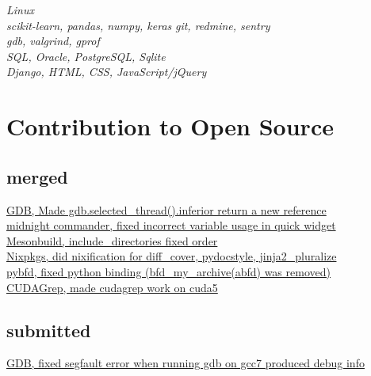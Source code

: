 \documentclass[10pt]{article} %
\begin{document}

{
\textit{Linux}\\
\textit{scikit-learn, pandas, numpy, keras}
\textit{git, redmine, sentry}\\
\textit{gdb, valgrind, gprof}\\
\textit{SQL, Oracle, PostgreSQL, Sqlite}\\
\textit{Django, HTML, CSS, JavaScript/jQuery}
}

\section{Contribution to Open Source}

\subsection{merged}
\href{https://github.com/bminor/binutils-gdb/commit/484d8d361de65a8489252d14511b77c142d859a1}{GDB, Made gdb.selected\_thread().inferior return a new reference}\\
\href{http://midnight-commander.org/ticket/3870?cversion=0&cnum_hist=1}{midnight commander, fixed incorrect variable usage in quick widget}\\
\href{https://github.com/mesonbuild/meson/pull/2976}{Mesonbuild, include\_directories fixed order}\\
\href{https://github.com/NixOS/nixpkgs/pull/33715}{Nixpkgs, did nixification for diff\_cover, pydocstyle, jinja2\_pluralize}\\
\href{https://github.com/orivej/pybfd/commit/f5ed88590c66a3570b7e5b9aa4c723c40686271d}{pybfd, fixed python binding (bfd\_my\_archive(abfd) was removed)}\\
\href{https://github.com/dzabraev/CUDA-grep/commit/79f4fddfab3cc7950cbe6c9b3a54bcb2b87dc3cc}{CUDAGrep, made cudagrep work on cuda5}

\subsection{submitted}

\href{https://sourceware.org/ml/gdb-patches/2018-01/msg00415.html}{GDB, fixed segfault error when running gdb on gcc7 produced debug info}


\end{document}
